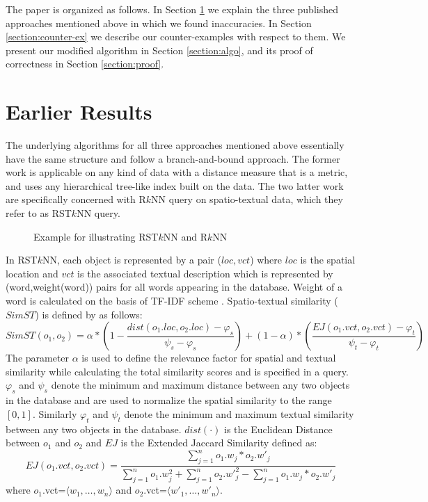 \documentclass[prodmode,letterpaper]{acmsmall}
\newcommand{\rknn}{R$k$NN\xspace}
\newcommand{\rstknn}{RST$k$NN\xspace}
\begin{document}
The paper is organized as follows. In Section \ref{section:earlier} we explain
the three published approaches mentioned above in which we found
inaccuracies. In Section \ref{section:counter-ex} we describe our counter-examples with respect to them.
We present our modified algorithm in Section \ref{section:algo}, and its
proof of correctness in Section \ref{section:proof}.

\section{Earlier Results}\label{section:earlier}
The underlying algorithms for all three approaches mentioned above essentially
have the same structure and follow a branch-and-bound approach. The former work
is applicable on any kind of data with a distance measure that is a metric, and
uses any hierarchical tree-like index built on the data. The two latter work are
specifically concerned with \rknn query on spatio-textual data, which they
refer to as \rstknn query.

\begin{figure}[!tbh]
\begin{center}
\caption{\small Example for illustrating \rstknn and \rknn}
\label{fig:example}
\end{center}
\end{figure}

In \rstknn, each object is
represented by a pair ($loc,vct$) where $loc$ is the spatial location and $vct$ is the
associated textual description which is represented by (word,weight(word)) pairs
for all words appearing in the database. Weight of a word
is calculated on the basis of TF-IDF scheme \cite{salton1988term}. Spatio-textual similarity ($SimST$) is defined by \cite{lu2011reverse} as follows:
\begin{equation}
SimST(o_1,o_2)=\alpha*(1-\frac{dist(o_1.loc,o_2.loc)-\varphi_s}{\psi_s- \varphi_s})+ (1-\alpha)*(\frac{EJ(o_1.vct,o_2.vct)-\varphi_t}{\psi_t- \varphi_t})
\end{equation} 
The parameter $\alpha$ is used to define the relevance factor for spatial and
textual similarity while calculating the total similarity scores and is
specified in a query. $\varphi_s$ and $\psi_s$ denote the minimum and maximum
distance between any two objects in the database and are used to normalize the
spatial similarity to the range $[0,1]$. Similarly $\varphi_t$ and $\psi_t$ denote
the minimum and maximum textual similarity between any two objects in the
database. $dist(\cdot)$ is the Euclidean Distance between $o_1$ and $o_2$ and
$EJ$ is the
Extended Jaccard Similarity \cite{tan2011v} defined as:
\begin{equation}
EJ(o_1.vct,o_2.vct)=\frac{ \sum_{j=1}^n o_1.w_j*o_2.{w'}_{j}}{\sum_{j=1}^n o_1.w_j^2+\sum_{j=1}^n o_2.{w'}_{j}^2-\sum_{j=1}^n o_1.w_j*o_2.{w'}_{j} }
\end{equation}
where $o_1$.vct=$\langle w_1,\ldots,w_n\rangle$ and $o_2$.vct=$\langle w'_1,\ldots,w'_n\rangle$.
\end{document}
